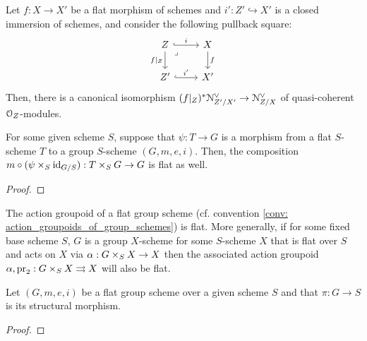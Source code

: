             \begin{corollary} \label{coro: flat_base_changes_of_conormal_sheaves}
                Let $f: X \to X'$ be a flat morphism of schemes and $i': Z' \hookrightarrow X'$ is a closed immersion of schemes, and consider the following pullback square:
                    $$
                        \begin{tikzcd}
                        	Z & X \\
                        	{Z'} & {X'}
                        	\arrow["{f|_Z}"', from=1-1, to=2-1]
                        	\arrow["{i'}", hook, from=2-1, to=2-2]
                        	\arrow["f", from=1-2, to=2-2]
                        	\arrow["i", hook, from=1-1, to=1-2]
                        	\arrow["\lrcorner"{anchor=center, pos=0.125}, draw=none, from=1-1, to=2-2]
                        \end{tikzcd}
                    $$
                Then, there is a canonical isomorphism $(f|_Z)^* \mathcal{N}_{Z'/X'}^{\vee} \to \mathcal{N}_{Z/X}^{\vee}$ of quasi-coherent $\mathcal{O}_Z$-modules. 
            \end{corollary}
            \begin{lemma} \label{lemma: flatness_criterion_for_action_groupoids_of_group_schemes}
                For some given scheme $S$, suppose that $\psi: T \to G$ is a morphism from a flat $S$-scheme $T$ to a group $S$-scheme $(G, m, e, i)$. Then, the composition $m \circ (\psi \x_S \id_{G/S}): T \x_S G \to G$ is flat as well.
            \end{lemma}
                \begin{proof}
                    
                \end{proof}
            \begin{corollary}
                The action groupoid of a flat group scheme (cf. convention \ref{conv: action_groupoids_of_group_schemes}) is flat. More generally, if for some fixed base scheme $S$, $G$ is a group $X$-scheme for some $S$-scheme $X$ that is flat over $S$ and acts on $X$ via $\alpha: G \x_S X \to X$ then the associated action groupoid $\alpha, \pr_2: G \x_S X \toto X$ will also be flat.
            \end{corollary}
            \begin{proposition} \label{prop: differential_forms_on_group_schemes}
                Let $(G, m, e, i)$ be a flat group scheme over a given scheme $S$ and that $\pi: G \to S$ is its structural morphism. 
            \end{proposition}
                \begin{proof}
                    
                \end{proof}
            
